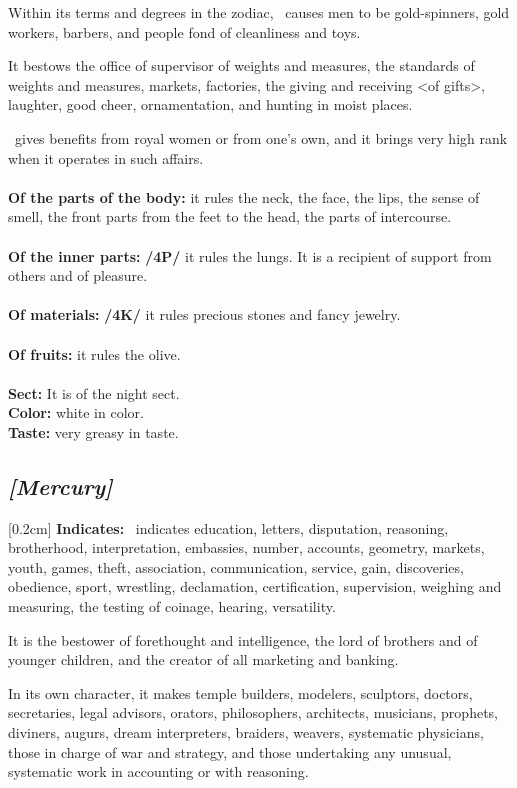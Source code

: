 \mndl[0.2cm]
Within its terms and degrees in the zodiac, \Venus\, causes men to be gold-spinners, gold workers, barbers, and people fond of cleanliness and toys. 

It bestows the office of supervisor of weights and measures, the standards of weights and measures, markets, factories, the giving and receiving <of gifts>, laughter, good cheer, ornamentation, and hunting in moist places.

\Venus\, gives benefits from royal women or from one’s own, and it brings very high rank when it operates in such affairs. \\
\\
\textbf{Of the parts of the body:} it rules the neck, the face, the lips, the sense of smell, the front parts from the feet to the head, the parts of intercourse. \\
\\
\textbf{Of the inner parts:} \textbf{/4P/} it rules the lungs. It is a recipient of support from others and of pleasure.\\ 
\\
\textbf{Of materials:} \textbf{/4K/} it rules precious stones and fancy jewelry. \\
\\ 
\textbf{Of fruits:} it rules the olive. \\
\\
\textbf{Sect:} It is of the night sect.\\
\textbf{Color:} white in color. \\
\textbf{Taste:} very greasy in taste.

\secbr
\subsection{\textit{[Mercury]}}
[0.2cm]
\noindent
{}
\textbf{Indicates:} \Mercury\,  indicates education, letters, disputation, reasoning, brotherhood, interpretation, embassies, number, accounts, geometry, markets, youth, games, theft, association, communication, service, gain, discoveries, obedience, sport, wrestling, declamation, certification, supervision, weighing and measuring, the testing of coinage, hearing, versatility. 

It is the bestower of forethought and intelligence, the lord of brothers and of younger children, and the creator of all marketing and banking. 

In its own character, it makes temple builders, modelers, sculptors, doctors, secretaries, legal advisors, orators, philosophers, architects, musicians, prophets, diviners, augurs, dream interpreters, braiders, weavers, systematic physicians, those in charge of war and strategy, and those undertaking any unusual, systematic work in accounting or  with reasoning. 

